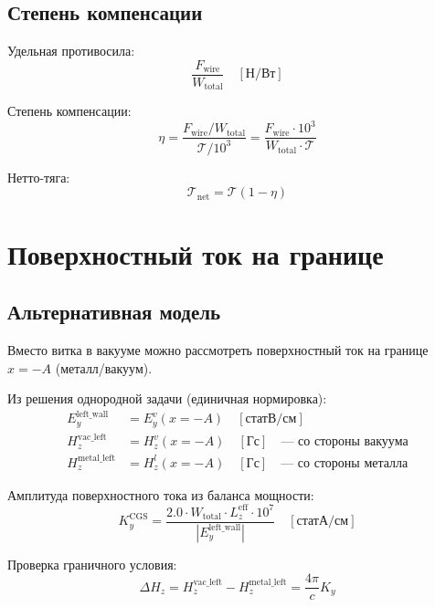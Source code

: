 \documentclass[a4paper,12pt]{article}
\begin{document}
\subsection{Степень компенсации}

Удельная противосила:
\begin{equation}
\frac{F_{\text{wire}}}{W_{\text{total}}} \quad [\text{Н/Вт}]
\end{equation}

Степень компенсации:
\begin{equation}
\boxed{
\eta = \frac{F_{\text{wire}} / W_{\text{total}}}{\mathcal{T} / 10^3} = \frac{F_{\text{wire}} \cdot 10^3}{W_{\text{total}} \cdot \mathcal{T}}
}
\end{equation}

Нетто-тяга:
\begin{equation}
\mathcal{T}_{\text{net}} = \mathcal{T} (1 - \eta)
\end{equation}

\section{Поверхностный ток на границе}

\subsection{Альтернативная модель}

Вместо витка в вакууме можно рассмотреть поверхностный ток на границе $x = -A$ (металл/вакуум).

Из решения однородной задачи (единичная нормировка):
\begin{align}
E_y^{\text{left\_wall}} &= E_y^v(x = -A) \quad [\text{статВ/см}] \\
H_z^{\text{vac\_left}} &= H_z^v(x = -A) \quad [\text{Гс}] \quad \text{--- со стороны вакуума} \\
H_z^{\text{metal\_left}} &= H_z^l(x = -A) \quad [\text{Гс}] \quad \text{--- со стороны металла}
\end{align}

Амплитуда поверхностного тока из баланса мощности:
\begin{equation}
K_y^{\text{CGS}} = \frac{2.0 \cdot W_{\text{total}} \cdot L_z^{\text{eff}} \cdot 10^7}{|E_y^{\text{left\_wall}}|} \quad [\text{статА/см}]
\end{equation}

Проверка граничного условия:
\begin{equation}
\Delta H_z = H_z^{\text{vac\_left}} - H_z^{\text{metal\_left}} = \frac{4\pi}{c} K_y
\end{equation}
\end{document}

